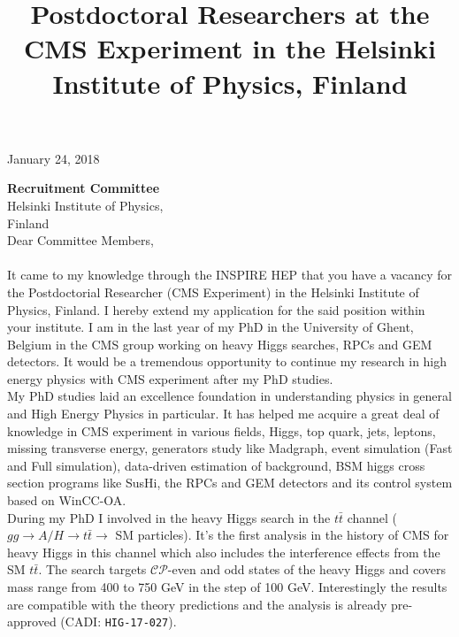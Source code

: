 \documentclass[]{article}
\title{\textbf{
Postdoctoral Researchers at the CMS Experiment in the Helsinki Institute of Physics, Finland
}}
\date{}
\begin{document}
\pagestyle{empty}
\fontsize{12}{15}
\selectfont
\maketitle
\thispagestyle{empty}
\begin{flushright}
January 24, 2018
\end{flushright} 
\noindent \textbf{Recruitment Committee}\\
\noindent Helsinki Institute of Physics,\\ 
\noindent Finland\\

\noindent Dear Committee Members,
\\
\\
It came to my knowledge through the INSPIRE HEP that you have a vacancy for the Postdoctorial Researcher (CMS Experiment) in the Helsinki Institute of Physics, Finland. I hereby extend my application for the said position within your institute. I am in the last year of my PhD in the University of Ghent, Belgium in the CMS group working on heavy Higgs searches, RPCs and GEM detectors. It would be a tremendous opportunity to continue my research in high energy physics with CMS experiment after my PhD studies.\\

\noindent My PhD studies laid an excellence foundation in understanding physics in general and High Energy Physics in particular. It has helped me acquire a great deal of knowledge in CMS experiment in various fields, Higgs, top quark, jets, leptons, missing transverse energy, generators study like Madgraph, event simulation (Fast and Full simulation), data-driven estimation of background, BSM higgs cross section programs like SusHi, the RPCs and GEM detectors and its control system based on WinCC-OA.\\
 
\noindent During my PhD I involved in the heavy Higgs search in the $t\bar t$ channel ($gg\rightarrow A/H\rightarrow t\bar t \rightarrow$ SM particles). It's the first analysis in the history of CMS for heavy Higgs in this channel which also includes the interference effects from the SM $t\bar t$. The search targets $\mathcal{CP}$-even and odd states of the heavy Higgs and covers mass range from 400 to 750 GeV in the step of 100 GeV. Interestingly the results are compatible with the theory predictions and the analysis is already pre-approved (CADI: \texttt{HIG-17-027}).\\
\end{document}
